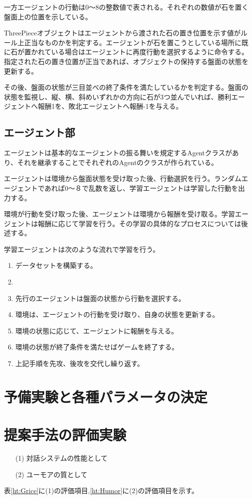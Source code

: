 一方エージェントの行動は0〜8の整数値で表される。それぞれの数値が石を置く盤面上の位置を示している。


ThreePieceオブジェクトはエージェントから渡された石の置き位置を示す値がルール上正当なものかを判定する。エージェントが石を置こうとしている場所に既に石が置かれている場合はエージェントに再度行動を選択するように命令する。指定された石の置き位置が正当であれば、オブジェクトの保持する盤面の状態を更新する。

その後、盤面の状態が三目並べの終了条件を満たしているかを判定する。盤面の状態を監視し、縦、横、斜めいずれかの方向に石が3つ並んでいれば、勝利エージェントへ報酬1を、敗北エージェントへ報酬-1を与える。

\subsection{エージェント部}
エージェントは基本的なエージェントの振る舞いを規定するAgentクラスがあり、それを継承することでそれぞれのAgentのクラスが作られている。

エージェントは環境から盤面状態を受け取った後、行動選択を行う。ランダムエージェントであれば0〜８で乱数を返し、学習エージェントは学習した行動を出力する。

環境が行動を受け取った後、エージェントは環境から報酬を受け取る。学習エージェントは報酬に応じて学習を行う。その学習の具体的なプロセスについては後述する。

学習エージェントは次のような流れで学習を行う。



\begin{enumerate}
  \item データセットを構築する。
  \item
  \item 先行のエージェントは盤面の状態から行動を選択する。
  \item 環境は、エージェントの行動を受け取り、自身の状態を更新する。
  \item 環境の状態に応じて、エージェントに報酬を与える。
  \item 環境の状態が終了条件を満たせばゲームを終了する。
  \item 上記手順を先攻、後攻を交代し繰り返す。
\end{enumerate}


\section{予備実験と各種パラメータの決定}

\section{提案手法の評価実験}

\begin{itemize}
\item [(1)]対話システムの性能として
\item [(2)]ユーモアの質として
\end{itemize}
表\ref{ht:Grice}に(1)の評価項目,\ref{ht:Humor}に(2)の評価項目を示す。